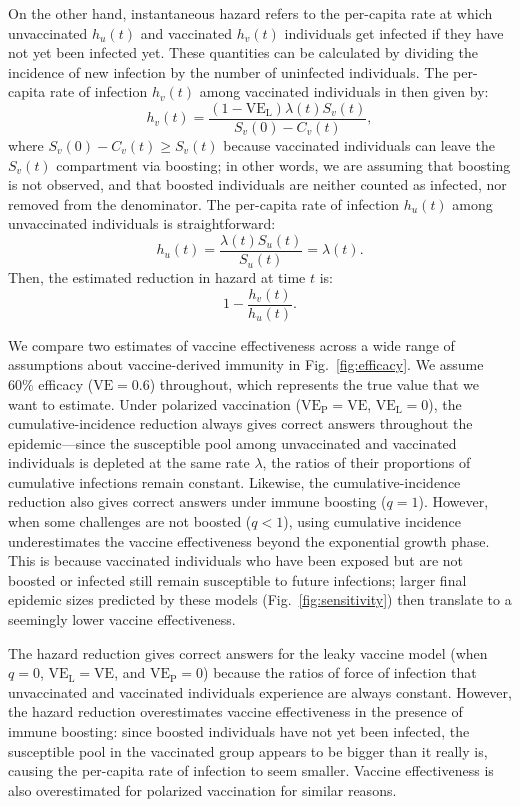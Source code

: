 \documentclass[12pt]{article}
\newcommand{\fref}[1]{Fig.~\ref{fig:#1}}
\newcommand{\VE}{\ensuremath{\mathrm{VE}}}
\newcommand{\VEP}{\ensuremath{\VE_{\mathrm{P}}}}
\newcommand{\VEL}{\ensuremath{\VE_{\mathrm{L}}}}
\begin{document}
On the other hand, instantaneous hazard refers to the per-capita rate at which unvaccinated $h_u(t)$ and vaccinated $h_v(t)$ individuals get infected if they have not yet been infected yet.
These quantities can be calculated by dividing the incidence of new infection by the number of uninfected individuals.
The per-capita rate of infection $h_v(t)$ among vaccinated individuals in then given by:
\begin{equation}
h_v(t) = \frac{(1-\VEL) \lambda(t) S_v(t)}{S_v(0) - C_v(t)},
\end{equation}
where $S_v(0) - C_v(t) \geq S_v(t)$ because vaccinated individuals can leave the $S_v(t)$ compartment via boosting;
in other words, we are assuming that boosting is not observed, and that boosted individuals are neither counted as infected, nor removed from the denominator.
The per-capita rate of infection $h_u(t)$ among unvaccinated individuals is straightforward: 
\begin{equation}
h_u(t) = \frac{\lambda(t) S_u(t)}{S_u(t)} = \lambda(t).
\end{equation}
Then, the estimated reduction in hazard at time $t$ is:
\begin{equation}
1 - \frac{h_v(t)}{h_u(t)}.
\end{equation}

We compare two estimates of vaccine effectiveness across a wide range of assumptions about vaccine-derived immunity in \fref{efficacy}.
We assume 60\% efficacy ($\VE = 0.6$) throughout, which represents the true value that we want to estimate.
Under polarized vaccination ($\VEP=\VE$, $\VEL=0$), the cumulative-incidence reduction always gives correct answers throughout the epidemic---since the susceptible pool among unvaccinated and vaccinated individuals is depleted at the same rate $\lambda$, the ratios of their proportions of cumulative infections remain constant.
Likewise, the cumulative-incidence reduction also gives correct answers under immune boosting ($q=1$).
However, when some challenges are not boosted ($q < 1$), using cumulative incidence underestimates the vaccine effectiveness beyond the exponential growth phase.
This is because vaccinated individuals who have been exposed but are not boosted or infected still remain susceptible to future infections; 
larger final epidemic sizes predicted by these models (\fref{sensitivity}) then translate to a seemingly lower vaccine effectiveness.

The hazard reduction gives correct answers for the leaky vaccine model (when $q=0$, $\VEL = \VE$, and $\VEP = 0$) because the ratios of force of infection that unvaccinated and vaccinated individuals experience are always constant.
However, the hazard reduction overestimates vaccine effectiveness in the presence of immune boosting: since boosted individuals have not yet been infected, the susceptible pool in the vaccinated group appears to be bigger than it really is, causing the per-capita rate of infection to seem smaller.
Vaccine effectiveness is also overestimated for polarized vaccination for similar reasons.
\end{document}

